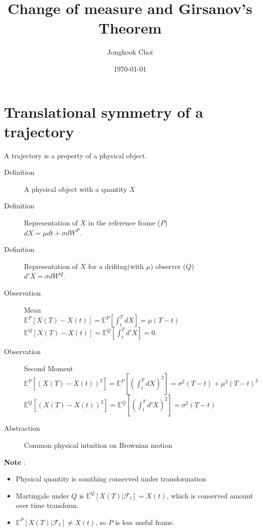 \documentclass{article}
\title{Change of measure and Girsanov's Theorem}
\author{Jongkook Choi}
\date{\today}
\begin{document}
\maketitle

\section{Translational symmetry of a trajectory}
A trajectory is a property of a physical object.
\begin{description}
    \item[Definition] A physical object with a quantity $X$
    \item[Definition] Representation of $X$ in the reference frame ($P$)\\ $dX = \mu dt + \sigma dW^P$.
    \item[Definition] Representation of $X$ for a drifitng(with $\mu$) observer ($Q$) \\ $d' X = \sigma dW^Q$.
    \item[Observation] Mean \\
          $\mathbb{E}^P[X(T)- X(t) ] = \mathbb{E}^P[ \int_t^T dX] =  \mu (T-t)$\\
          $\mathbb{E}^Q[X(T) -X(t) ] = \mathbb{E}^Q[ \int_t^T d'X] = 0$.
    \item[Observation] Second Moment \\
          $\mathbb{E}^P[(X(T)-X(t))^2] =  \mathbb{E}^P[(\int_t^T dX)^2]=  \sigma^2 (T-t) + \mu^2(T-t)^2$\\
          $\mathbb{E}^Q[(X(T)-X(t))^2] =  \mathbb{E}^Q[(\int_t^T d'X)^2]=  \sigma^2 (T-t)$
    \item[Abstraction] Common physical intuition on Brownian motion

\end{description}
\textbf{Note} :
\begin{itemize}
    \item Physical quantity is somthing conserved under transformation
    \item Martingale under $Q$ is $\mathbb{E}^Q[X(T)|\mathcal{F}_t] = X(t)$, which is conserved amount over time transform.
    \item $\mathbb{E}^P[X(T)|\mathcal{F}_t] \neq X(t)$, so $P$ is less useful frame.
\end{itemize}
\end{document}
